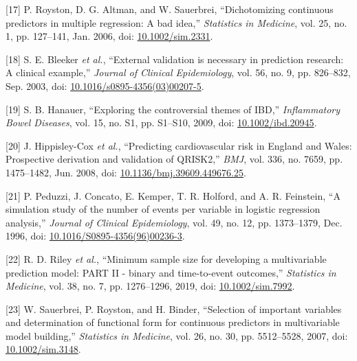 \documentclass[
]{article}
\newenvironment{cslreferences}%
  {}%
  {\par}
\begin{document}
\begin{cslreferences}
\leavevmode\hypertarget{ref-royston_dichotomizing_2006}{}%
{[}17{]} P. Royston, D. G. Altman, and W. Sauerbrei, ``Dichotomizing continuous predictors in multiple regression: A bad idea,'' \emph{Statistics in Medicine}, vol. 25, no. 1, pp. 127--141, Jan. 2006, doi: \href{https://doi.org/10.1002/sim.2331}{10.1002/sim.2331}.

\leavevmode\hypertarget{ref-bleeker_external_2003}{}%
{[}18{]} S. E. Bleeker \emph{et al.}, ``External validation is necessary in prediction research: A clinical example,'' \emph{Journal of Clinical Epidemiology}, vol. 56, no. 9, pp. 826--832, Sep. 2003, doi: \href{https://doi.org/10.1016/s0895-4356(03)00207-5}{10.1016/s0895-4356(03)00207-5}.

\leavevmode\hypertarget{ref-hanauer_exploring_2009}{}%
{[}19{]} S. B. Hanauer, ``Exploring the controversial themes of IBD,'' \emph{Inflammatory Bowel Diseases}, vol. 15, no. S1, pp. S1--S10, 2009, doi: \href{https://doi.org/10.1002/ibd.20945}{10.1002/ibd.20945}.

\leavevmode\hypertarget{ref-hippisley-cox_predicting_2008}{}%
{[}20{]} J. Hippisley-Cox \emph{et al.}, ``Predicting cardiovascular risk in England and Wales: Prospective derivation and validation of QRISK2,'' \emph{BMJ}, vol. 336, no. 7659, pp. 1475--1482, Jun. 2008, doi: \href{https://doi.org/10.1136/bmj.39609.449676.25}{10.1136/bmj.39609.449676.25}.

\leavevmode\hypertarget{ref-peduzzi_simulation_1996}{}%
{[}21{]} P. Peduzzi, J. Concato, E. Kemper, T. R. Holford, and A. R. Feinstein, ``A simulation study of the number of events per variable in logistic regression analysis,'' \emph{Journal of Clinical Epidemiology}, vol. 49, no. 12, pp. 1373--1379, Dec. 1996, doi: \href{https://doi.org/10.1016/S0895-4356(96)00236-3}{10.1016/S0895-4356(96)00236-3}.

\leavevmode\hypertarget{ref-riley_minimum_2019}{}%
{[}22{]} R. D. Riley \emph{et al.}, ``Minimum sample size for developing a multivariable prediction model: PART II - binary and time-to-event outcomes,'' \emph{Statistics in Medicine}, vol. 38, no. 7, pp. 1276--1296, 2019, doi: \href{https://doi.org/10.1002/sim.7992}{10.1002/sim.7992}.

\leavevmode\hypertarget{ref-sauerbrei_selection_2007}{}%
{[}23{]} W. Sauerbrei, P. Royston, and H. Binder, ``Selection of important variables and determination of functional form for continuous predictors in multivariable model building,'' \emph{Statistics in Medicine}, vol. 26, no. 30, pp. 5512--5528, 2007, doi: \href{https://doi.org/10.1002/sim.3148}{10.1002/sim.3148}.


\end{cslreferences}
\end{document}
